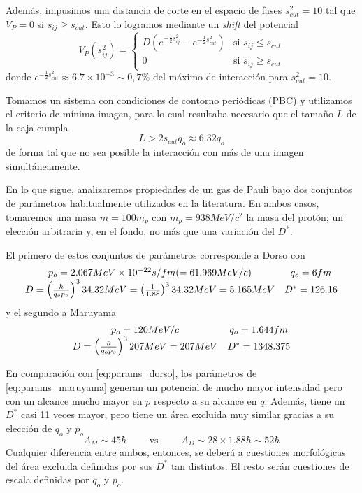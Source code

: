 Además, impusimos una distancia de corte en el espacio de fases $s_{cut}^2=10$ tal que $V_P=0$ si $s_{ij}\geq s_{cut}$.
Esto lo logramos mediante un \textit{shift} del potencial
\[ V_P(s_{ij}^2) = \left\{\begin{matrix} D(e^{-\frac{1}{2}s_{ij}^2}-e^{-\frac{1}{2}s_{cut}^2}) & \text{si } s_{ij}\leq s_{cut} \\ 0 & \text{si } s_{ij}\geq s_{cut} \end{matrix}\right. \]
donde $e^{-\frac{1}{2}s_{cut}^2}\approx 6.7\times10^{-3}\sim 0,7\%$ del máximo de interacción para $s_{cut}^2=10$.

Tomamos un sistema con condiciones de contorno periódicas (PBC) y utilizamos el criterio de mínima imagen, para lo cual resultaba necesario que el tamaño $L$ de la caja cumpla
\[ L >2 s_{cut}q_o \approx 6.32q_o \]
de forma tal que no sea posible la interacción con más de una imagen simultáneamente.

En lo que sigue, analizaremos propiedades de un gas de Pauli bajo dos conjuntos de parámetros habitualmente utilizados en la literatura.
En ambos casos, tomaremos una masa $m=100m_p$ con $m_p=938MeV/c^2$ la masa del protón; un elección arbitraria y, en el fondo, no más que una variación del $D^*$.

El primero de estos conjuntos de parámetros corresponde a Dorso \cite{Dorso1987} con
\begin{equation}{\label{eq:params_dorso}}
 \begin{matrix}
  p_o = 2.067 MeV\times 10^{-22}s/fm (= 61.969 MeV/c) & q_o = 6 fm\\
  D = \left(\frac{\hbar}{q_op_o}\right)^3 34.32MeV = \left(\frac{1}{1.88}\right)^3 34.32MeV = 5.165MeV & D^* = 126.16
 \end{matrix}
\end{equation}
y el segundo a Maruyama \cite{Maruyama2012}
\begin{equation}{\label{eq:params_maruyama}}
 \begin{matrix}
  p_o = 120 MeV/c & q_o = 1.644 fm\\
  D = \left(\frac{\hbar}{q_op_o}\right)^3 207MeV = 207MeV & D^* = 1348.375
 \end{matrix}
\end{equation}

En comparación con \eqref{eq:params_dorso}, los parámetros de \eqref{eq:params_maruyama} generan un potencial de mucho mayor intensidad pero con un alcance mucho mayor en $p$
respecto a su alcance en $q$.
Además, tiene un $D^*$ casi 11 veces mayor, pero tiene un área excluida muy similar gracias a su elección de $q_o$ y $p_o$
\[ A_M\sim 45\hbar \qquad \text{ vs } \qquad  A_D\sim 28\times1.88\hbar \sim 52\hbar\]
Cualquier diferencia entre ambos, entonces, se deberá a cuestiones morfológicas del área excluida definidas por sus $D^*$ tan distintos.
El resto serán cuestiones de escala definidas por $q_o$ y $p_o$.

